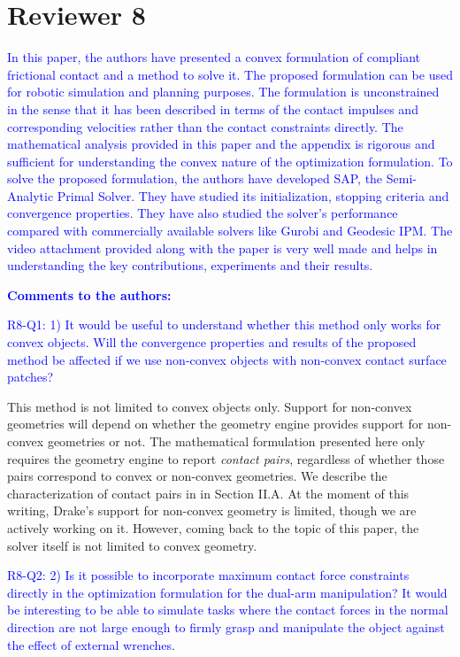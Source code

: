 \section{Reviewer 8}
\label{sec:reviewer_8}

\textcolor{blue}{In this paper, the authors have presented a convex formulation
of compliant frictional contact and a method to solve it. The proposed
formulation can be used for robotic simulation and planning purposes. The
formulation is unconstrained in the sense that it has been described in terms of
the contact impulses and corresponding velocities rather than the contact
constraints directly. The mathematical analysis provided in this paper and the
appendix is rigorous and sufficient for understanding the convex nature of the
optimization formulation. To solve the proposed formulation, the authors have
developed SAP, the Semi-Analytic Primal Solver. They have studied its
initialization, stopping criteria and convergence properties. They have also
studied the solver's performance compared with commercially available solvers
like Gurobi and Geodesic IPM. The video attachment provided along with the paper
is very well made and helps in understanding the key contributions, experiments
and their results.}

\textcolor{blue}{\textbf{Comments to the authors:}}

\textcolor{blue}{R8-Q1: 1) It would be useful to understand whether this method
only works for convex objects. Will the convergence properties and results of
the proposed method be affected if we use non-convex objects with non-convex
contact surface patches?}

This method is not limited to convex objects only. Support for non-convex
geometries will depend on whether the geometry engine provides support for
non-convex geometries or not. The mathematical formulation presented here only
requires the geometry engine to report \emph{contact pairs}, regardless of
whether those pairs correspond to convex or non-convex geometries. We describe
the characterization of contact pairs in in Section II.A. At the moment of this
writing, Drake's support for non-convex geometry is limited, though we are
actively working on it. However, coming back to the topic of this paper, the
solver itself is not limited to convex geometry.

\vspace{5mm}
\textcolor{blue}{R8-Q2: 2) Is it possible to incorporate maximum contact force
constraints directly in the optimization formulation for the dual-arm
manipulation? It would be interesting to be able to simulate tasks where the
contact forces in the normal direction are not large enough to firmly grasp and
manipulate the object against the effect of external wrenches.}

